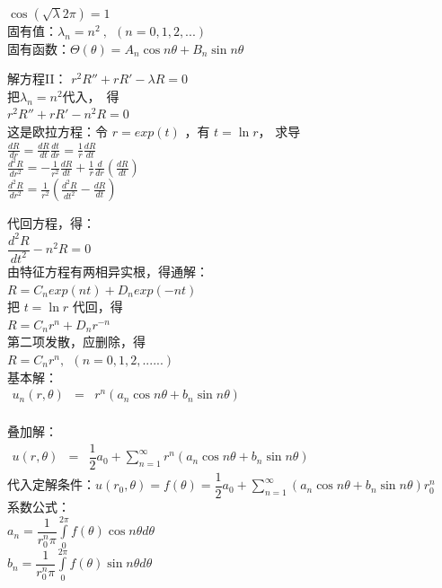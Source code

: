 \begin{frame}
	$\cos (\sqrt {\lambda} 2\pi)=1$   \\ 	
	固有值：$\lambda _n =n^2 ~,~~ (n=0,1,2,...)$  \\ 
	固有函数：$\displaystyle  \Theta(\theta)=A_n\cos n \theta +B_n \sin n \theta $\\   \vspace{0.6cm}

	解方程II：
	{$\displaystyle  r^2 R'' +r R' -\lambda R =0 $  } \\ 
	把$\lambda_n =n^2 $代入， 得 \\ 
	{$\displaystyle  r^2 R'' +r R' -n^2R =0 $  } \\ 
	这是欧拉方程：令 $ r=exp(t) $ ，有 $t=\ln r$， 求导 \\ 
	$ \displaystyle \frac{dR}{dr} =\frac{dR}{dt} \frac{dt}{dr} =\frac{1}{r} \frac{dR}{dt} $ \\ 
	$ \displaystyle \frac{d^2R}{dr^2} =-\frac{1}{r^2}\frac{dR}{dt} + \frac{1}{r} \frac{d}{dr} (\frac{dR}{dt} )$ \\ 
	$ \displaystyle \frac{d^2R}{dr^2} =\frac{1}{r^2} (\frac{d^2R}{dt^2}-\frac{dR}{dt} )$ \\ 		
\end{frame}	

\begin{frame}	
	代回方程，得：\\ 
	$ \displaystyle   \dfrac{d^2R}{dt^2} -n^2 R =0 $ \\ 
	由特征方程有两相异实根，得通解：\\ 
	$ R=C_nexp(nt)+D_n exp(-nt) $\\
	把 $t=\ln r$ 代回，得\\
	$R=C_n r^n +D_nr^{-n}$ \\ 
	第二项发散，应删除，得\\
	$R= C_n r^n,  ~~ (n=0,1,2,......) $		\\
	基本解：\\ 
	$\begin{array}{llll}
		u_n(r,\theta) &=&  r^n(a_n \cos n\theta +b_n \sin n \theta )   \\ 
	\end{array}$ \\ 	
\end{frame}	

\begin{frame}	
	叠加解：\\ 
	$\begin{array}{llll}
		u(r, \theta) &=& \dfrac{1}{2} a_0 +\sum\limits_{n=1}^{\infty }r^n (a_n  \cos n\theta +b_n \sin n \theta ) 
	\end{array}$ \\ 
	代入定解条件：$ u(r_0,\theta)=f (\theta) =  \dfrac{1}{2} a_0 +\sum\limits_{n=1}^{\infty } (a_n\cos n\theta +b_n \sin n \theta ) r_0^n $\\ 
	系数公式：\\ 
	$  \displaystyle  a_n = \dfrac{1}{r_0 ^n \pi }  \int\limits_{0}^{2\pi} f(\theta) \cos n \theta d\theta $ \\ 
	$  \displaystyle  b_n = \dfrac{1}{r_0 ^n \pi }  \int\limits_{0}^{2\pi} f(\theta) \sin n \theta d\theta $  \\ 	
\end{frame}	

